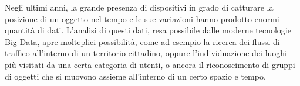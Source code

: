 Negli ultimi anni, la grande presenza di dispositivi in grado di catturare la posizione di un oggetto nel
tempo e le sue variazioni hanno prodotto enormi quantità di dati.
L'analisi di questi dati, resa possibile dalle moderne tecnologie Big Data, apre molteplici possibilità, come
ad esempio la ricerca dei flussi di traffico all'interno di un territorio cittadino, oppure l'individuazione
dei luoghi più visitati da una certa categoria di utenti, o ancora il riconoscimento di gruppi di oggetti che si
muovono assieme all'interno di un certo spazio e tempo.





